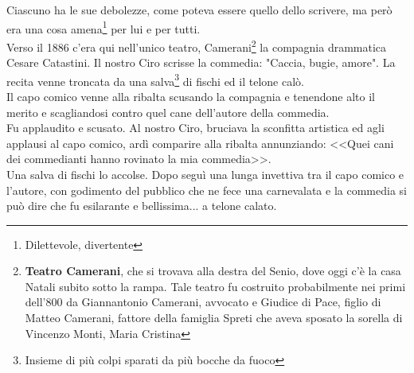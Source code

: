 Ciascuno ha le sue debolezze, come poteva essere quello dello scrivere, ma però era una cosa amena\footnote{Dilettevole, divertente} per lui e per tutti. \\
\indent Verso il 1886 c'era qui nell'unico teatro, Camerani\footnote{\textbf{Teatro Camerani}, che si trovava alla destra del Senio, dove oggi c'è la casa Natali subito sotto la rampa. Tale teatro fu costruito probabilmente nei primi dell'800 da Giannantonio Camerani, avvocato e Giudice di Pace, figlio di Matteo Camerani, fattore della famiglia Spreti che aveva sposato la sorella di Vincenzo Monti, Maria Cristina} la compagnia drammatica Cesare Catastini. Il nostro Ciro scrisse la commedia: "Caccia, bugie, amore". La recita venne troncata da una salva\footnote{Insieme di più colpi sparati da più bocche da fuoco} di fischi ed il telone calò.\\
\indent Il capo comico venne alla ribalta scusando la compagnia e tenendone alto il merito e scagliandosi contro quel cane dell'autore della commedia.\\
\indent Fu applaudito e scusato. Al nostro Ciro, bruciava la sconfitta artistica ed agli applausi al capo comico, ardì comparire alla ribalta annunziando: <<Quei cani dei commedianti hanno rovinato la mia commedia>>.\\
\indent Una salva di fischi lo accolse. Dopo seguì una lunga invettiva tra il capo comico e l'autore, con godimento del pubblico che ne fece una carnevalata e la commedia si può dire che fu esilarante e bellissima... a telone calato. 
\newpage

